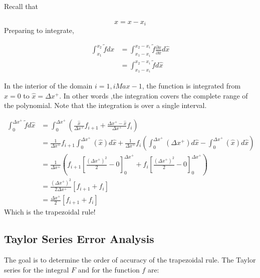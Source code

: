 \documentclass[12pt]{article}
\begin{document}
Recall that 

\[ \hat{x} = x - x_i\]
Preparing to integrate,

\begin{align*}
    \int_{x_1}^{x_2} \widetilde{f} dx &=
    \int_{x_1-x_i}^{x_2-x_i} \widetilde{f} \frac{\partial x}{\partial \hat{x}}d\hat{x}\\
                                      &=
                                      \int_{x_1-x_i}^{x_2 - x_i} \widetilde{f} d\hat{x}
\end{align*}

In the interior of the domain $i = 1, iMax - 1$, the function is integrated 
from $\hat{x} = 0$ to $\hat{x} = \Delta x^+$. In other words ,the integration 
covers the complete range of the polynomial. Note that the integration is over 
a single interval.

\begin{align*}
    \int_0^{\Delta x^+} \widetilde{f} d\hat{x}&=
    \int_0^{\Delta x^+}
    \left( 
        \frac{\hat{x}}{\Delta x^+}f_{i+1} +
        \frac{\Delta x^+ - \hat{x}}{\Delta x^+}f_i
\right) \\ &= 
\frac{1}{\Delta x^+}f_{i+1}
\int_{0}^{\Delta x^+} 
\left(\hat{x}  \right) d\hat{x}
+
\frac{1}{\Delta x^+}
f_{i}
\left(
    \int_{0}^{\Delta x^+} 
    \left( \Delta x^+  \right) d\hat{x}
    -
    \int_{0}^{\Delta x^+} 
    \left( 
        \hat{x}
    \right) d\hat{x}
\right)\\
           &=\frac{1}{\Delta x^+}
           \left( 
               f_{i+1}\left[ 
                   \frac{\left( \Delta x^+ \right)^2}{
                   2} - 0
               \right]_0^{\Delta x^+}
               +
               f_i
               \left[ 
\frac{\left( \Delta x^+ \right)^2}{
                   2} - 0
               \right]_0^{\Delta x^+}
           \right) \\ &=
           \frac{\left( \Delta x^+ \right)^2}{2 \Delta x^+}
           \left[ f_{i+1} +f_i\right] \\
           &= 
           \frac{\Delta x^+}{2 }
           \left[ f_{i+1} +f_i\right] 
\end{align*}
Which is the trapezoidal rule!

\subsection{Taylor Series Error Analysis}
The goal is to determine the order of accuracy of the trapezoidal rule. 
The Taylor series for the integral $F$ and for the function $f$ are:
\end{document}
